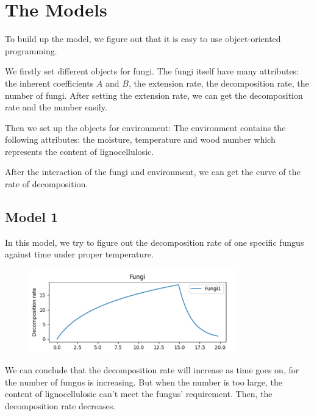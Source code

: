 \documentclass{mcmthesis}
\begin{document}
\section{The Models}
To build up the model, we figure out that it is easy to use object-oriented programming.

We firstly set different objects for fungi.
The fungi itself have many attributes: the inherent coefficients $A$ and $B$, the extension rate, the decomposition rate, the number of fungi.
After setting the extension rate, we can get the decomposition rate and the number easily.

Then we set up the objects for environment:
The environment contains the following attributes: the moisture, temperature and wood number which represents the content of lignocellulosic.

After the interaction of the fungi and environment, we can get the curve of the rate of decomposition.

\subsection{Model 1}
In this model, we try to figure out the decomposition rate of one specific fungus against time under proper temperature. 
\begin{figure}[H]
  \centering
  \includegraphics[width=0.8\textwidth]{figures/Model 1.png}
\end{figure}
We can conclude that the decomposition rate will increase as time goes on, for the number of fungus is increasing.
But when the number is too large, the content of lignocellulosic can't meet the fungus' requirement.
Then, the decomposition rate decreases.
\end{document}
